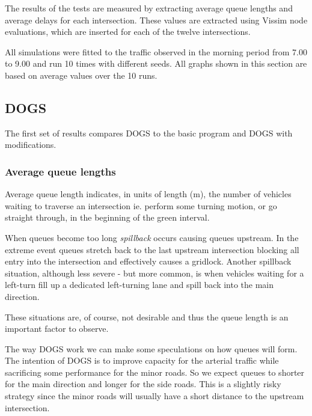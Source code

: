 The results of the tests are measured by extracting average queue lengths and average delays for each intersection. These values are extracted using Vissim node evaluations, which are inserted for each of the twelve intersections.

All simulations were fitted to the traffic observed in the morning period from 7.00 to 9.00 and run 10 times with different seeds. All graphs shown in this section are based on average values over the 10 runs.

\subsection{DOGS}
The first set of results compares DOGS to the basic program and DOGS with modifications.

\subsubsection*{Average queue lengths}
Average queue length indicates, in units of length (m), the number of vehicles waiting to traverse an intersection ie. perform some turning motion, or go straight through, in the beginning of the green interval. 

When queues become too long \textit{spillback} occurs causing queues upstream. In the extreme event queues stretch back to the last upstream intersection blocking all entry into the intersection and effectively causes a gridlock.
Another spillback situation, although less severe - but more common, is when vehicles waiting for a left-turn fill up a dedicated left-turning lane and spill back into the main direction.

These situations are, of course, not desirable and thus the queue length is an important factor to observe.

The way DOGS work we can make some speculations on how queues will form. The intention of DOGS is to improve capacity for the arterial traffic while sacrificing some performance for the minor roads. So we expect queues to shorter for the main direction and longer for the side roads. This is a slightly risky strategy since the minor roads will usually have a short distance to the upstream intersection.

